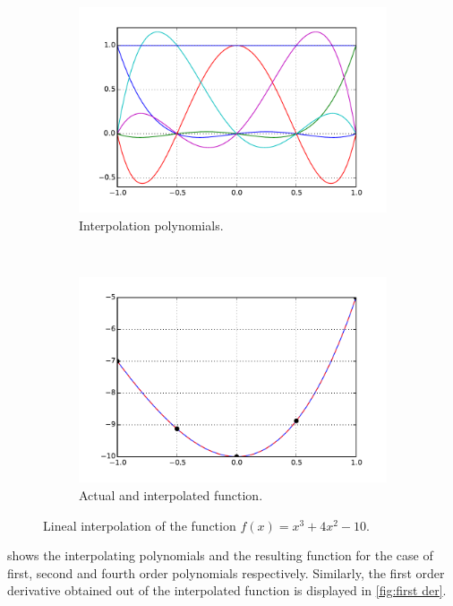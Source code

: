 \begin{figure}[H]
\begin{subfigure}[b]{0.45\textwidth}
		\includegraphics[width=\textwidth]{third.pdf}
		\caption{Interpolation polynomials.}
	\end{subfigure}\,
%
	\begin{subfigure}[b]{0.45\textwidth}\qquad
		\includegraphics[width=\textwidth]{intertri.pdf}
		\caption{Actual and interpolated function.}
	\end{subfigure}
\caption{Lineal interpolation of the function $f(x) = {x^3} + 4{x^2} - 10$.}
\label{fig:several interpol}
\end{figure}

 shows the interpolating polynomials and the resulting function for the case of first, second and fourth order polynomials respectively. Similarly, the first order derivative obtained out of the interpolated function is displayed in \cref{fig:first der}. 

